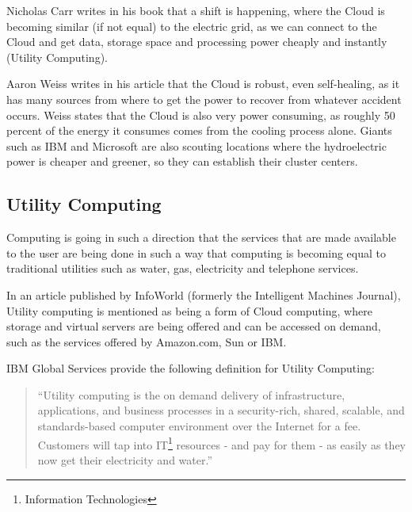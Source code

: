 Nicholas Carr writes in his book that a shift is happening, where the Cloud is becoming similar (if not equal) to the electric grid, as we can connect to the Cloud and get data, storage space and processing power cheaply and instantly (Utility Computing). \cite{carr}

Aaron Weiss writes in his article that the Cloud is robust, even self-healing, as it has many sources from where to get the power to recover from whatever accident occurs. Weiss states that the Cloud is also very power consuming, as roughly 50 percent of the energy it consumes comes from the cooling process alone. Giants such as IBM and Microsoft are also scouting locations where the hydroelectric power is cheaper and greener, so they can establish their cluster centers.\cite{aaron-clouds}



\subsection{Utility Computing} \label{utility}

Computing is going in such a direction that the services that are made available to the user are being done in such a way that computing is becoming equal to traditional utilities such as water, gas, electricity and telephone services.\cite{Buyya2009599}

In an article published by InfoWorld (formerly the Intelligent Machines Journal), Utility computing is mentioned as being a form of Cloud computing, where storage and virtual servers are being offered and can be accessed on demand, such as the services offered by Amazon.com, Sun or IBM. \cite{grids-and-clouds}

IBM Global Services provide the following definition for Utility Computing:

\begin{quote}
``Utility computing is the on demand delivery of infrastructure, applications, and business processes in a security-rich, shared, scalable, and standards-based computer environment over the Internet for a fee. Customers will tap into IT\footnote{Information Technologies} resources - and pay for them - as easily as they now get their electricity and water.''~\cite{ibm-utility}
\end{quote}

